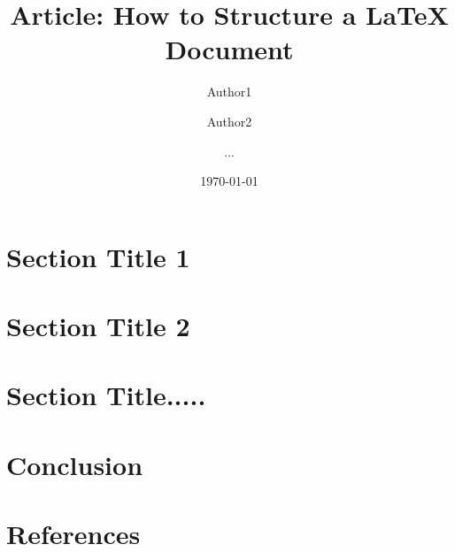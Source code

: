 \documentclass[11pt,twocolumn,a4paper]{article}
\begin{document}
\title{Article: How to Structure a LaTeX Document}
\author{Author1 \and Author2 \and ...}
\date{\today}

\maketitle

\section{Section Title 1}

\section{Section Title 2}

\section{Section Title.....}

\section{Conclusion}

\section*{References}
\end{document}
